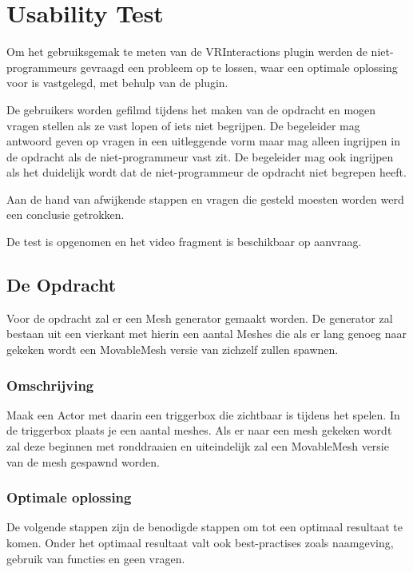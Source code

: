 
\chapter{Usability Test}
\label{appendix:usertest1}
\lhead{}

Om het gebruiksgemak te meten van de VRInteractions plugin werden de niet-programmeurs gevraagd een probleem op te lossen, waar een optimale oplossing voor is vastgelegd, met behulp van de plugin. 

De gebruikers worden gefilmd tijdens het maken van de opdracht en mogen vragen stellen als ze vast lopen of iets niet begrijpen. De begeleider mag antwoord geven op vragen in een uitleggende vorm maar mag alleen ingrijpen in de opdracht als de niet-programmeur vast zit. De begeleider mag ook ingrijpen als het duidelijk wordt dat de niet-programmeur de opdracht niet begrepen heeft.

Aan de hand van afwijkende stappen en vragen die gesteld moesten worden werd een conclusie getrokken.

De test is opgenomen en het video fragment is beschikbaar op aanvraag.

\section{De Opdracht}
Voor de opdracht zal er een Mesh generator gemaakt worden. De generator zal bestaan uit een vierkant met hierin een aantal Meshes die als er lang genoeg naar gekeken wordt een MovableMesh versie van zichzelf zullen spawnen.

\subsection{Omschrijving}
Maak een Actor met daarin een triggerbox die zichtbaar is tijdens het spelen. In de triggerbox plaats je een aantal meshes. Als er naar een mesh gekeken wordt zal deze beginnen met ronddraaien en uiteindelijk zal een MovableMesh versie van de mesh gespawnd worden. 

\subsection{Optimale oplossing}
De volgende stappen zijn de benodigde stappen om tot een optimaal resultaat te komen. Onder het optimaal resultaat valt ook best-practises zoals naamgeving, gebruik van functies en geen vragen.

